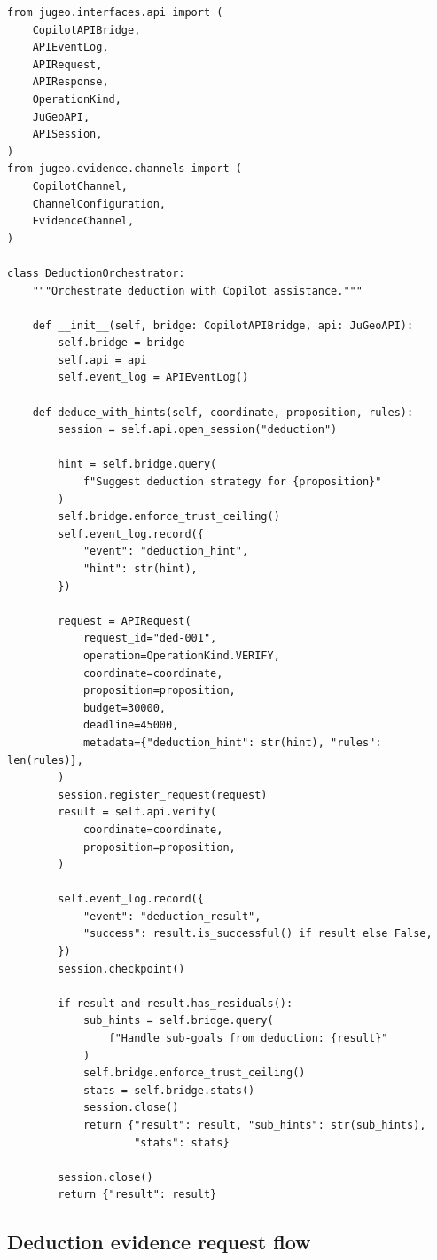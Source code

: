 \documentclass[11pt]{article}
\begin{document}
\begin{lstlisting}[style=jugeo-python,
  caption={Deduction orchestration with CopilotAPIBridge},
  label={lst:dedbridge}]
from jugeo.interfaces.api import (
    CopilotAPIBridge,
    APIEventLog,
    APIRequest,
    APIResponse,
    OperationKind,
    JuGeoAPI,
    APISession,
)
from jugeo.evidence.channels import (
    CopilotChannel,
    ChannelConfiguration,
    EvidenceChannel,
)

class DeductionOrchestrator:
    """Orchestrate deduction with Copilot assistance."""

    def __init__(self, bridge: CopilotAPIBridge, api: JuGeoAPI):
        self.bridge = bridge
        self.api = api
        self.event_log = APIEventLog()

    def deduce_with_hints(self, coordinate, proposition, rules):
        session = self.api.open_session("deduction")

        hint = self.bridge.query(
            f"Suggest deduction strategy for {proposition}"
        )
        self.bridge.enforce_trust_ceiling()
        self.event_log.record({
            "event": "deduction_hint",
            "hint": str(hint),
        })

        request = APIRequest(
            request_id="ded-001",
            operation=OperationKind.VERIFY,
            coordinate=coordinate,
            proposition=proposition,
            budget=30000,
            deadline=45000,
            metadata={"deduction_hint": str(hint), "rules": len(rules)},
        )
        session.register_request(request)
        result = self.api.verify(
            coordinate=coordinate,
            proposition=proposition,
        )

        self.event_log.record({
            "event": "deduction_result",
            "success": result.is_successful() if result else False,
        })
        session.checkpoint()

        if result and result.has_residuals():
            sub_hints = self.bridge.query(
                f"Handle sub-goals from deduction: {result}"
            )
            self.bridge.enforce_trust_ceiling()
            stats = self.bridge.stats()
            session.close()
            return {"result": result, "sub_hints": str(sub_hints),
                    "stats": stats}

        session.close()
        return {"result": result}
\end{lstlisting}

\subsection{Deduction evidence request flow}
\end{document}
